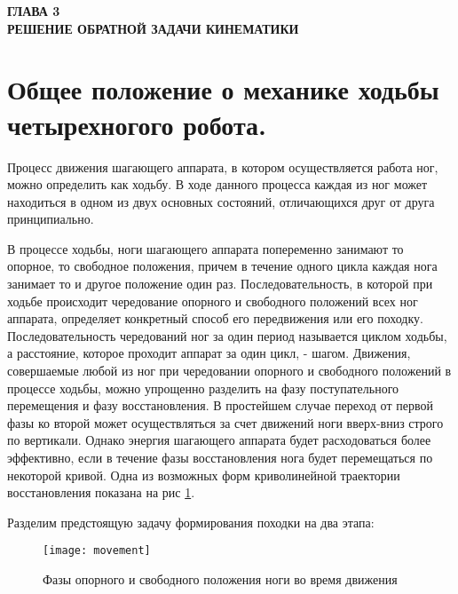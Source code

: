 \newpage
\begin{center}
	\textbf{\large ГЛАВА 3 \\ РЕШЕНИЕ ОБРАТНОЙ ЗАДАЧИ КИНЕМАТИКИ}
\end{center}


\section{Общее положение о механике ходьбы четырехногого робота.}\label{C3_1}
Процесс движения шагающего аппарата, в котором осуществляется работа ног, можно определить как ходьбу. В ходе данного процесса каждая из ног может находиться в одном из двух основных состояний, отличающихся друг от друга принципиально.

В процессе ходьбы, ноги шагающего аппарата попеременно занимают то опорное, то свободное положения, причем в течение одного цикла каждая нога занимает то и другое положение один раз. Последовательность, в которой при ходьбе происходит чередование опорного и свободного положений всех ног аппарата, определяет конкретный способ его передвижения или его походку. Последовательность чередований ног за один период называется циклом ходьбы, а расстояние, которое проходит аппарат за один цикл, - шагом.
Движения, совершаемые любой из ног при чередовании опорного и свободного положений в процессе ходьбы, можно упрощенно разделить на фазу поступательного перемещения и фазу восстановления. В простейшем случае переход от первой фазы ко второй может осуществляться за счет движений ноги вверх-вниз строго по вертикали. Однако энергия шагающего аппарата будет расходоваться более эффективно, если в течение фазы восстановления нога будет перемещаться по некоторой кривой. Одна из возможных форм криволинейной траектории восстановления показана на рис \ref{movement}. 

Разделим предстоящую задачу формирования походки на два этапа:


\begin{figure}[h!]
	\begin{center}
		\texttt{[image: movement]}
		\caption{Фазы опорного и свободного положения ноги во время движения}
		\label{movement}
	\end{center}
\end{figure}


